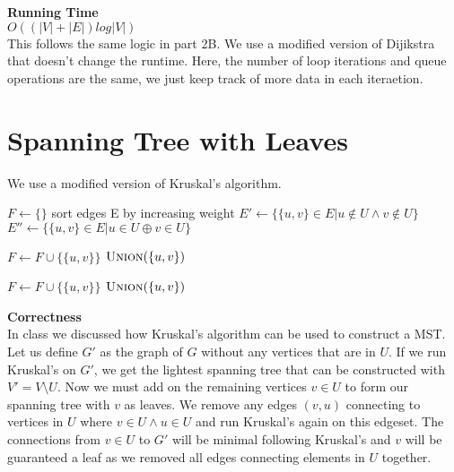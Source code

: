 \documentclass{article}
\begin{document}
\textbf{Running Time} \\
$O((|V| + |E|)log|V|)$ \\
This follows the same logic in part 2B. We use a modified version of Dijikstra that doesn't change the runtime.
Here, the number of loop iterations and queue operations are the same, we just keep track of more data in each iteraetion.

\newpage
\section{Spanning Tree with Leaves}
We use a modified version of Kruskal's algorithm.

\begin{algorithmic}
            \State {}
        \EndFor

        \State $F \gets \text{\{ \}}$
        \State sort edges E by increasing weight
        \State $E' \gets \{\{u, v\} \in E | u \notin U \land v \notin U\}$ 
        \State $E'' \gets \{\{u, v\} \in E | u \in U \oplus v \in U\}$

                \State $F \gets F \cup \{\{u, v\}\}$
                \State $\Call{Union}{\{u, v\}}$
            \EndIf
        \EndFor

                \State $F \gets F \cup \{\{u, v\}\}$
                \State $\Call{Union}{\{u, v\}}$
            \EndIf
        \EndFor

    \EndFunction
\end{algorithmic}

\textbf{Correctness} \\
In class we discussed how Kruskal's algorithm can be used to construct a MST. Let us define $G'$ as the graph of $G$ without any vertices that are in $U$.
If we run Kruskal's on $G'$, we get the lightest spanning tree that can be constructed with $V' = V \setminus U$.
Now we must add on the remaining vertices $v \in U$ to form our spanning tree with $v$ as leaves. We remove any edges $(v, u)$ connecting to vertices in $U$ where $v \in U \land u\in U$
and run Kruskal's again on this edgeset. The connections from $v \in U$ to $G'$ will be minimal following Kruskal's and $v$ will be guaranteed a leaf as we removed all edges connecting elements in $U$ together.      
\\
\end{document}

